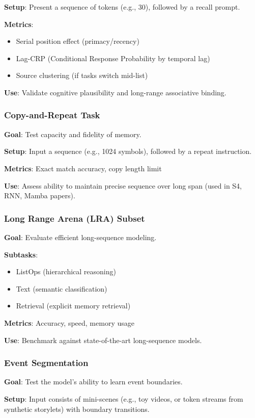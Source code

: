 \documentclass[11pt]{article}
\begin{document}
\textbf{Setup}: Present a sequence of tokens (e.g., 30), followed by a recall prompt.

\textbf{Metrics}:
\begin{itemize}
\item Serial position effect (primacy/recency)
\item Lag-CRP (Conditional Response Probability by temporal lag)
\item Source clustering (if tasks switch mid-list)
\end{itemize}

\textbf{Use}: Validate cognitive plausibility and long-range associative binding.

\subsubsection{Copy-and-Repeat Task}
\textbf{Goal}: Test capacity and fidelity of memory.

\textbf{Setup}: Input a sequence (e.g., 1024 symbols), followed by a repeat instruction.

\textbf{Metrics}: Exact match accuracy, copy length limit

\textbf{Use}: Assess ability to maintain precise sequence over long span (used in S4, RNN, Mamba papers).

\subsubsection{Long Range Arena (LRA) Subset}
\textbf{Goal}: Evaluate efficient long-sequence modeling.

\textbf{Subtasks}:
\begin{itemize}
\item ListOps (hierarchical reasoning)
\item Text (semantic classification)
\item Retrieval (explicit memory retrieval)
\end{itemize}

\textbf{Metrics}: Accuracy, speed, memory usage

\textbf{Use}: Benchmark against state-of-the-art long-sequence models.

\subsubsection{Event Segmentation}
\textbf{Goal}: Test the model's ability to learn event boundaries.

\textbf{Setup}: Input consists of mini-scenes (e.g., toy videos, or token streams from synthetic storylets) with boundary transitions.
\end{document}
